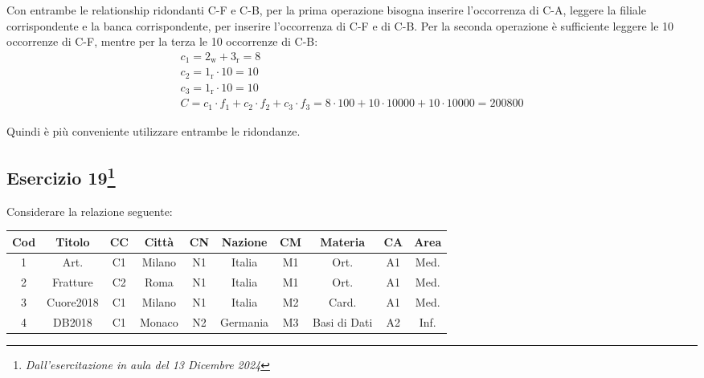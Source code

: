\documentclass{article}
\begin{document}
Con entrambe le relationship ridondanti C-F e C-B, per la prima operazione bisogna inserire l'occorrenza di C-A, leggere la filiale corrispondente e la banca corrispondente, per inserire l'occorrenza di C-F e di C-B. Per la seconda operazione è sufficiente leggere le 10 occorrenze di C-F, mentre per la terza le 10 occorrenze di C-B:
\begin{gather*}
    c_1=2_\text{w}+3_\text{r}=8\\
    c_2=1_\text{r}\cdot10=10\\
    c_3=1_\text{r}\cdot10=10\\
    C=c_1\cdot f_1+c_2\cdot f_2+c_3\cdot f_3=8\cdot100+10\cdot10000+10\cdot10000=200800
\end{gather*}

Quindi è più conveniente utilizzare entrambe le ridondanze. 

\subsection{Esercizio 19\footnote{\textit{Dall'esercitazione in aula del 13 Dicembre 2024}}}

Considerare la relazione seguente:

\begin{center}
    \begin{tabular}{|c|c|c|c|c|c|c|c|c|c|}
        \hline
        Cod & Titolo & CC & Città & CN & Nazione & CM & Materia & CA & Area\\
        \hline
        1 & Art. & C1 & Milano & N1 & Italia & M1&Ort.&A1&Med.\\
        \hline
        2&Fratture&C2&Roma&N1&Italia&M1&Ort.&A1&Med.\\\hline
        3&Cuore2018&C1&Milano&N1&Italia&M2&Card.&A1&Med.\\\hline
        4&DB2018&C1&Monaco&N2&Germania&M3&Basi di Dati&A2&Inf.\\\hline
    \end{tabular}
\end{center}
\end{document}
